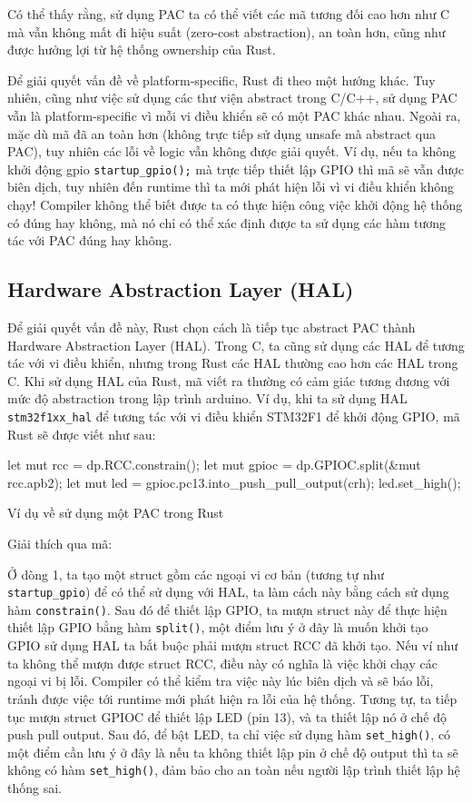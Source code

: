 Có thể thấy rằng, sử dụng PAC ta có thể viết các mã tương đối cao hơn như C mà vẫn không mất đi hiệu suất (zero-cost abstraction), an toàn hơn, cũng như được hưởng lợi từ hệ thống ownership của Rust.

Để giải quyết vấn đề về platform-specific, Rust đi theo một hướng khác.
Tuy nhiên, cũng như việc sử dụng các thư viện abstract trong C/C++, sử dụng PAC vẫn là platform-specific vì mỗi vi điều khiển sẽ có một PAC khác nhau.
Ngoài ra, mặc dù mã đã an toàn hơn (không trực tiếp sử dụng unsafe mà abstract qua PAC), tuy nhiên các lỗi về logic vẫn không được giải quyết.
Ví dụ, nếu ta không khởi động gpio \texttt{startup_gpio();} mà trực tiếp thiết lập GPIO thì mã sẽ vẫn được biên dịch, tuy nhiên đến runtime thì ta mới phát hiện lỗi vì vi điều khiển không chạy!
Compiler không thể biết được ta có thực hiện công việc khởi động hệ thống có đúng hay không, mà nó chỉ có thể xác định được ta sử dụng các hàm tương tác với PAC đúng hay không.

\subsection{Hardware Abstraction Layer (HAL)}
Để giải quyết vấn đề này, Rust chọn cách là tiếp tục abstract PAC thành Hardware Abstraction Layer (HAL).
Trong C, ta cũng sử dụng các HAL để tương tác với vi điều khiển, nhưng trong Rust các HAL thường cao hơn các HAL trong C.
Khi sử dụng HAL của Rust, mã viết ra thường có cảm giác tương đương với mức độ abstraction trong lập trình arduino.
Ví dụ, khi ta sử dụng HAL \texttt{stm32f1xx\_hal} để tương tác với vi điều khiển STM32F1 để khởi động GPIO, mã Rust sẽ được viết như sau:
\begin{listing}[ht]
\begin{rustcode}
let mut rcc = dp.RCC.constrain();
let mut gpioc = dp.GPIOC.split(&mut rcc.apb2);
let mut led = gpioc.pc13.into_push_pull_output(crh);
led.set_high();
\end{rustcode}
\caption{Ví dụ về sử dụng một PAC trong Rust}
\end{listing}

Giải thích qua mã:

Ở dòng 1, ta tạo một struct gồm các ngoại vi cơ bản (tương tự như \texttt{startup_gpio}) để có thể sử dụng với HAL, ta làm cách này bằng cách sử dụng hàm \texttt{constrain()}.
Sau đó để thiết lập GPIO, ta mượn struct này để thực hiện thiết lập GPIO bằng hàm \texttt{split()}, một điểm lưu ý ở đây là muốn khởi tạo GPIO sử dụng HAL ta bắt buộc phải mượn struct RCC đã khởi tạo.
Nếu ví như ta không thể mượn được struct RCC, điều này có nghĩa là việc khởi chạy các ngoại vi bị lỗi.
Compiler có thể kiểm tra việc này lúc biên dịch và sẽ báo lỗi, tránh được việc tới runtime mới phát hiện ra lỗi của hệ thống.
Tương tự, ta tiếp tục mượn struct GPIOC để thiết lập LED (pin 13), và ta thiết lập nó ở chế độ push pull output.
Sau đó, để bật LED, ta chỉ việc sử dụng hàm \texttt{set_high()}, có một điểm cần lưu ý ở đây là nếu ta không thiết lập pin ở chế độ output thì ta sẽ không có hàm \texttt{set_high()}, đảm bảo cho an toàn nếu người lập trình thiết lập hệ thống sai.

